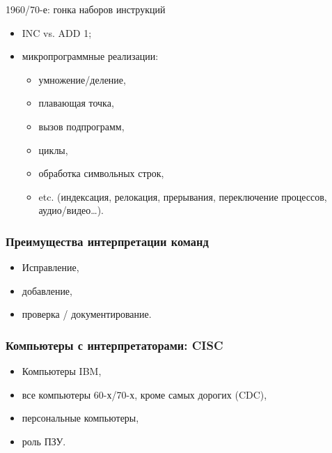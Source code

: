 \begin{frame}{1960/70-е: гонка наборов инструкций}
\begin{itemize}
\item INC vs. ADD 1;
\pause\item микропрограммные реализации:
    \begin{itemize}
    \item умножение/деление,
    \item плавающая точка,
    \item вызов подпрограмм,
    \item циклы,
    \item обработка символьных строк,
    \item etc. (индексация, релокация, прерывания, переключение процессов, аудио/видео…).
    \end{itemize}
\end{itemize}
\end{frame}

\begin{frame}
\frametitle{Преимущества интерпретации команд}
\begin{itemize}
    \item Исправление,
    \item добавление,
    \item проверка / документирование.
\end{itemize}
\end{frame}

\begin{frame}
\frametitle{Компьютеры с интерпретаторами: CISC}
\begin{itemize}
    \item Компьютеры IBM,
    \item все компьютеры 60-х/70-х, кроме самых дорогих (CDC),
    \item персональные компьютеры,
    \item роль ПЗУ.
\end{itemize}
\end{frame}

